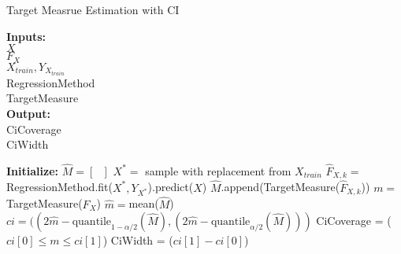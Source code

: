 \begin{algorithm}[!ht] \caption{Target Measrue Estimation with CI}
 \hspace*{\algorithmicindent} \textbf{Inputs:} \\
 \hspace*{\algorithmicindent} $X$  \\
 \hspace*{\algorithmicindent} $F_X$   \\
 \hspace*{\algorithmicindent} $X_{train}, Y_{X_{train}}$  \\
 \hspace*{\algorithmicindent} RegressionMethod  \\
 \hspace*{\algorithmicindent} TargetMeasure  \\
 \hspace*{\algorithmicindent} \textbf{Output:} \\
 \hspace*{\algorithmicindent} CiCoverage \\
 \hspace*{\algorithmicindent} CiWidth \\
\begin{algorithmic}[1]
    \State \textbf{Initialize:} $\hat{M} = \left[ \text{ } \right]$
     
        \State $X^{\ast} = $ sample with replacement from $X_{train}$
        \State $\hat{F}_{X,k} = $ RegressionMethod.fit($X^{\ast}, Y_{X^{\ast}}$).predict($X$)
        \State $\hat{M}$.append(TargetMeasure($\hat{F}_{X, k}$)) 
    \EndFor
    \State $m =$ TargetMeasure($F_X$) 
    \State $\hat{m} = $mean($\hat{M}$)
    \State $ci = ((2\hat{m} - \text{quantile}_{1-\alpha/2}(\hat{M}), (2\hat{m} - \text{quantile}_{\alpha/2}(\hat{M})))$ 
    \State CiCoverage = ($ ci\left[ 0 \right] \leq m \leq ci\left[ 1 \right]$)
    \State CiWidth = ($ci\left[ 1 \right] - ci\left[ 0 \right] $)
\end{algorithmic}
\end{algorithm}\label{pc:target-measure-baseline}




